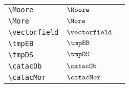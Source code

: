 \begin{longtable}{lll}
 {\color[rgb]{0.5,0.5,0.5}\texttt{\textbackslash Moore}} & $\Moore$ & \\ 
 {\color[rgb]{0.5,0.5,0.5}\texttt{\textbackslash More}} & $\More$ & \\ 
 {\color[rgb]{0.5,0.5,0.5}\texttt{\textbackslash vectorfield}} & $\vectorfield$ & \\ 
 {\color[rgb]{0.5,0.5,0.5}\texttt{\textbackslash tmpEB}} & $\tmpEB$ & \\ 
 {\color[rgb]{0.5,0.5,0.5}\texttt{\textbackslash tmpDS}} & $\tmpDS$ & \\ 
 {\color[rgb]{0.5,0.5,0.5}\texttt{\textbackslash catacOb}} & $\catacOb$ & \\ 
 {\color[rgb]{0.5,0.5,0.5}\texttt{\textbackslash catacMor}} & $\catacMor$ & \\ 
 \end{longtable}
